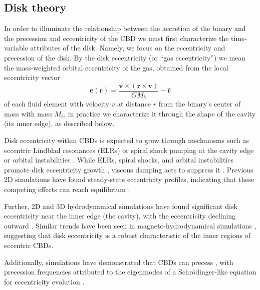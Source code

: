 \documentclass[fleqn,usenatbib]{mnras}
\begin{document}
\subsection{Disk theory}

In order to illuminate the relationship between the accretion of the binary and the precession and eccentricity of the CBD we must first characterize the time-variable attributes of the disk. Namely, we focus on the eccentricity and precession of the disk. By the disk eccentricity (or ``gas eccentricity'') we mean the mass-weighted orbital eccentricity of the gas, obtained from the local eccentricity vector
\begin{equation}\label{eqn:ecc_vector}
    \mathbf{e}(\mathbf{r}) = \frac{\mathbf{v}\times(\mathbf{r}\times\mathbf{v})}{GM_b} - \hat{\mathbf{r}}
\end{equation}
of each fluid element with velocity $v$ at distance $r$ from the binary's center of mass with mass $M_b$, in practice we characterize it through the shape of the cavity (its inner edge), as described below.

Disk eccentricity within CBDs is expected to grow through mechanisms such as eccentric Lindblad resonances (ELRs) or spiral shock pumping at the cavity edge \citep{lubow_91, whitehurst_94, paardekooper_2008, kley_2008, shi_2012} or orbital instabilities \citep{dorazio_2013, mcwilliams_instability}. While ELRs, spiral shocks, and orbital instabilities promote disk eccentricity growth \citep{lubow_91, shi_2012}, viscous damping acts to suppress it \citep{Goodchild_2006}. Previous 2D simulations have found steady-state eccentricity profiles, indicating that these competing effects can reach equilibrium \citep{miranda_munoz_lai_2017, siwek_prefacc}.

Further, 2D and 3D hydrodynamical simulations have found significant disk eccentricity near the inner edge (the cavity), with the eccentricity declining outward \citep{MacFadyen_08, miranda_munoz_lai_2017, siwek_prefacc, ragusa_lynch}. Similar trends have been seen in magneto-hydrodynamical simulations \citep{shi_2012}, suggesting that disk eccentricity is a robust characteristic of the inner regions of eccentric CBDs.

Additionally, simulations have demonstrated that CBDs can precess \citep{nelson_2003, shi_2012, miranda_munoz_lai_2017, Thun_2017, siwek_prefacc}, with precession frequencies attributed to the eigenmodes of a Schrödinger-like equation for eccentricity evolution \citep{Goodchild_2006, shi_2012, Teyssandier_2016, Lee_2019, munoz_lithwick_2020, Lubow_2022}.
\end{document}
